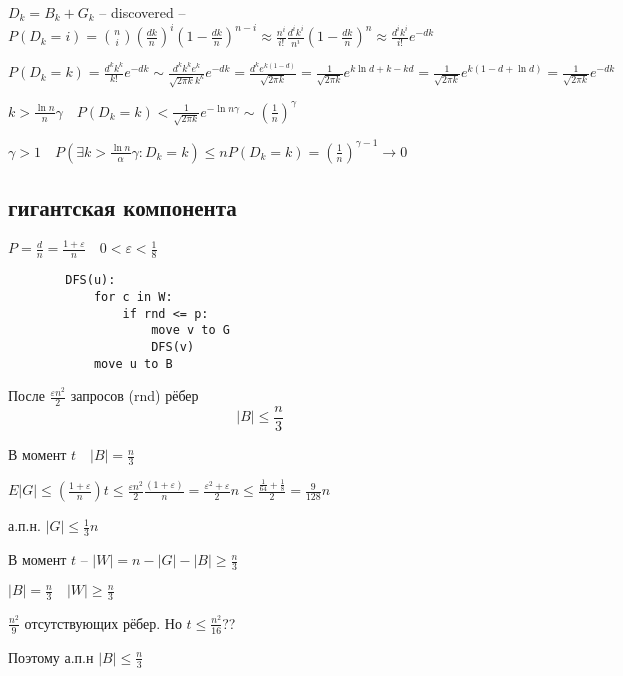 \documentclass{book}
\theoremstyle{definition}
\begin{document}
  $D_k = B_k  + G_k$ -- discovered --  $P\left( D_k = i \right)  = {n\choose i} \left( \frac{dk}{n} \right) ^i \left( 1 - \frac{dk}{n} \right) ^{n-i} \approx \frac{n^i}{i!} \frac{d^ik^i}{n^i}\left( 1 - \frac{dk}{n} \right) ^n \approx \frac{d^ik^i}{i!}e^{-dk}$ 

  $P(D_k = k) = \frac{d^kk^k}{k!}e^{-dk} \sim \frac{d^kk^ke^k}{\sqrt{2\pi k}k^k }e^{-dk} = \frac{d^ke^{k\left( 1-d \right) }}{\sqrt{2\pi k} }=\frac{1}{\sqrt{2\pi k} } e^{k\ln d+k-kd} = \frac{1}{\sqrt{2\pi k} }e^{k\left( 1 - d + \ln d \right) }  = \frac{1}{\sqrt{2\pi k} }e^{-dk}$

  $k >  \frac{\ln n}{n}\gamma \quad P(D_k = k) < \frac{1}{\sqrt{2\pi k} } e^{-\ln n\gamma} \sim \left( \frac{1}{n} \right) ^{\gamma}$


  $\gamma > 1\quad P\left( \exists k > \frac{\ln n}{\alpha}\gamma: D_k = k \right) \leqslant  n P\left( D_k = k \right)  = \left( \frac{1}{n} \right) ^{\gamma -1} \to 0$

  \subsection{гигантская компонента }

    $P = \frac{d}{n} = \frac{1+\varepsilon}{n}\quad 0 < \varepsilon < \frac{1}{8}$ 

    \begin{lstlisting}
        DFS(u):
            for c in W:
                if rnd <= p:
                    move v to G
                    DFS(v)
            move u to B
    \end{lstlisting}

    \begin{lemma}
        После $\frac{\varepsilon n^2}{2}$ запросов (rnd)  рёбер \[\left| B \right| \leqslant \frac{n}{3}\]

        В момент $t\quad \left| B \right| =\frac{n}{3}$ 

        $E|G| \leqslant \left( \frac{1+\varepsilon}{n} \right) t \leqslant \frac{\varepsilon n^2}{2} \frac{\left( 1+\varepsilon \right) }{n} = \frac{\varepsilon^2+\varepsilon}{2}n \leqslant \frac{\frac{1}{64} + \frac{1}{8}}{2} = \frac{9}{128}n$ 

        а.п.н. $|G| \leqslant  \frac{1}{3}n$ 

         В момент $t$ -- $\left| W \right|  = n - \left| G \right|  - \left| B \right|  \geqslant \frac{n}{3}$ 

         $\left| B \right|  = \frac{n}{3}\quad \left| W \right|  \geqslant  \frac{n}{3}$ 

         $\frac{n^2}{9}$ отсутствующих рёбер. Но $ t \leqslant \frac{n^2}{16}$??

         Поэтому а.п.н $\left| B \right| \leqslant \frac{n}{3}$
    \end{lemma}
\end{document}
